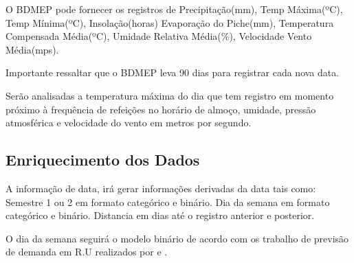 \documentclass[	12pt, Times, openright, twoside, a4paper, english, brazil]{abntex2}
\begin{document}
        	O BDMEP pode fornecer os registros de Precipitação(mm), Temp Máxima(ºC), Temp Mínima(ºC), Insolação(horas)
        	Evaporação do Piche(mm), Temperatura Compensada Média(ºC), Umidade Relativa Média(\%), Velocidade Vento Média(mps).
        	
        	Importante ressaltar que o BDMEP leva 90 dias para registrar cada nova data.
        	
        	Serão analisadas a temperatura máxima do dia que tem registro em momento próximo à frequência de refeições no horário de almoço, umidade, pressão atmosférica e velocidade do vento em metros por segundo.
        	
        	\subsection{Enriquecimento dos Dados}
            	A informação de data, irá gerar informações derivadas da data tais como: 
            	Semestre 1 ou 2 em formato categórico e binário.
            	Dia da semana em formato categórico e binário.
            	Distancia em dias até o registro anterior e posterior.
            	
            	 
            	O dia da semana seguirá o modelo binário de acordo com os trabalho de previsão de demanda em R.U realizados por \cite{Lopes2008} e \cite{Rocha2011}.
        
        \begin{figure}[H]
        \end{figure}
	
\end{document}
